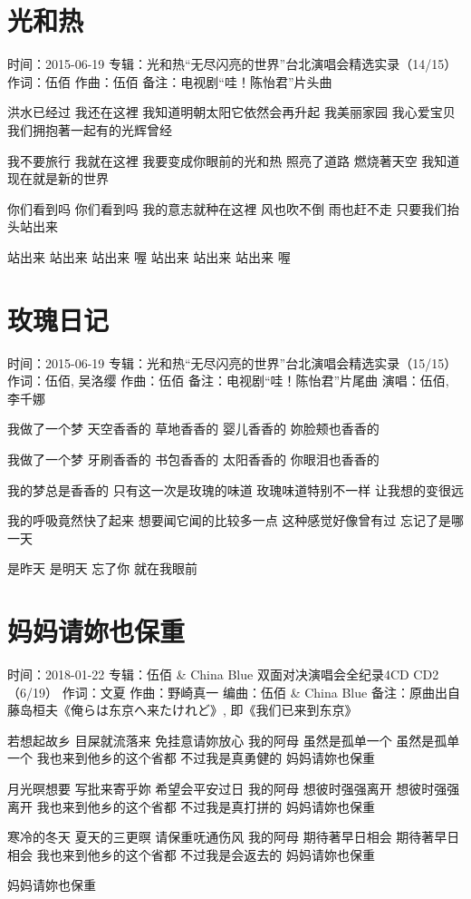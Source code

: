 \documentclass[UTF8,a4paper,oneside,twocolumn,12pt]{ctexbook}
\newcommand{\infopair}[2]{\textbullet #1：#2}
\newcommand{\zc}[1][伍佰]{\infopair{作词}{#1}}
\newcommand{\zq}[1][伍佰]{\infopair{作曲}{#1}}
\newcommand{\bq}[1][伍佰]{\infopair{编曲}{#1}}
\newcommand{\zj}[1]{\infopair{专辑}{#1}}
\newcommand{\sj}[1]{\infopair{时间}{#1}}
\newcommand{\bz}[1]{\infopair{备注}{#1}}
\newenvironment{info}{\begin{flushleft}\kaishu
	}
	{\end{flushleft}\normalsize\yahei\par}
\newenvironment{lyric}{
	}
{}
\begin{document}
\section{光和热}
\begin{info}
	\sj{2015-06-19}
	\zj{光和热“无尽闪亮的世界”台北演唱会精选实录（14/15）}
	\zc
	\zq
	\bz{电视剧“哇！陈怡君”片头曲}
\end{info}
\begin{lyric}
	洪水已经过  我还在这裡
	我知道明朝太阳它依然会再升起
	我美丽家园  我心爱宝贝
	我们拥抱著一起有的光辉曾经

	我不要旅行  我就在这裡
	我要变成你眼前的光和热
	照亮了道路  燃烧著天空
	我知道现在就是新的世界

	你们看到吗   你们看到吗
	我的意志就种在这裡
	风也吹不倒  雨也赶不走
	只要我们抬头站出来

	站出来  站出来  站出来  喔
	站出来  站出来  站出来  喔
\end{lyric}

\section{玫瑰日记}
\begin{info}
	\sj{2015-06-19}
	\zj{光和热“无尽闪亮的世界”台北演唱会精选实录（15/15）}
	\zc[伍佰, 吴洛缨]
	\zq
	\bz{电视剧“哇！陈怡君”片尾曲}
	\infopair{演唱}{伍佰, 李千娜}
\end{info}
\begin{lyric}
	我做了一个梦
	天空香香的  草地香香的
	婴儿香香的  妳脸颊也香香的

	我做了一个梦
	牙刷香香的  书包香香的
	太阳香香的  你眼泪也香香的

	我的梦总是香香的
	只有这一次是玫瑰的味道
	玫瑰味道特别不一样
	让我想的变很远

	我的呼吸竟然快了起来
	想要闻它闻的比较多一点
	这种感觉好像曾有过
	忘记了是哪一天

	是昨天  是明天
	忘了你  就在我眼前
\end{lyric}

\section{妈妈请妳也保重}
\begin{info}
	\sj{2018-01-22}
	\zj{伍佰 \& China Blue 双面对决演唱会全纪录4CD CD2（6/19）}
	\zc[文夏]
	\zq[野崎真一]
	\bq[伍佰 \& China Blue]
	\bz{原曲出自藤岛桓夫《俺らは东京へ来たけれど》, 即《我们已来到东京》}
\end{info}
\begin{lyric}
	若想起故乡 目屎就流落来
	免挂意请妳放心 我的阿母
	虽然是孤单一个 虽然是孤单一个
	我也来到他乡的这个省都
	不过我是真勇健的
	妈妈请妳也保重

	月光暝想要 写批来寄乎妳
	希望会平安过日 我的阿母
	想彼时强强离开 想彼时强强离开
	我也来到他乡的这个省都
	不过我是真打拼的
	妈妈请妳也保重

	寒冷的冬天 夏天的三更暝
	请保重呒通伤风 我的阿母
	期待著早日相会 期待著早日相会
	我也来到他乡的这个省都
	不过我是会返去的
	妈妈请妳也保重

	妈妈请妳也保重
\end{lyric}
\end{document}
